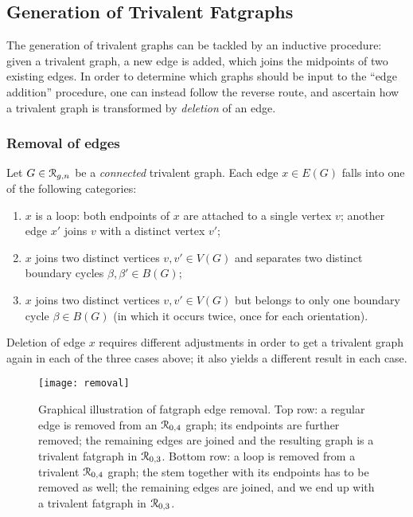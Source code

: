 \subsection{Generation of Trivalent Fatgraphs}
\label{sec:stage1-trivalent}

The generation of trivalent graphs can be tackled by an inductive
procedure: given a trivalent graph, a new edge is added, which joins
the midpoints of two existing edges.  
In order to determine which graphs should be input to the ``edge
addition'' procedure, one can instead follow the reverse route, and
ascertain how a trivalent graph is transformed by \emph{deletion} of
an edge.

\subsubsection{Removal of edges}
\label{sec:removal}

Let $G \in \mathcal{R}_{g,n}$ be a \emph{connected} trivalent graph. Each edge
$x \in E(G)$ falls into one of the following categories:
\begin{enumerate}[\sl A)]
\item $x$ is a loop: both endpoints of $x$ are
  attached to a single vertex $v$; another edge $x'$ joins $v$ with a
  distinct vertex $v'$;
\item $x$ joins two distinct vertices $v, v'
  \in V(G)$ and separates two distinct boundary cycles $\beta, \beta'
  \in B(G)$;
\item $x$ joins two distinct vertices $v, v'
  \in V(G)$ but belongs to only one boundary cycle $\beta \in B(G)$
  (in which it occurs twice, once for each orientation).
\end{enumerate}
Deletion of edge $x$ requires different adjustments in order to get a
trivalent graph again in each of the three cases above; it also yields
a different result in each case.
\begin{figure}
  \centering
  \texttt{[image: removal]}
  \caption{Graphical illustration of fatgraph edge removal.  Top row: a regular edge is removed from an $\mathcal{R}_{0,4}$ graph; its endpoints are further removed; the remaining edges are joined and the resulting graph is a trivalent fatgraph in $\mathcal{R}_{0,3}$.  Bottom row: a loop is removed from a trivalent $\mathcal{R}_{0,4}$ graph; the stem together with its endpoints has to be removed as well; the remaining edges are joined, and we end up with a trivalent fatgraph in $\mathcal{R}_{0,3}$.}
  \label{fig:removal}
\end{figure}

